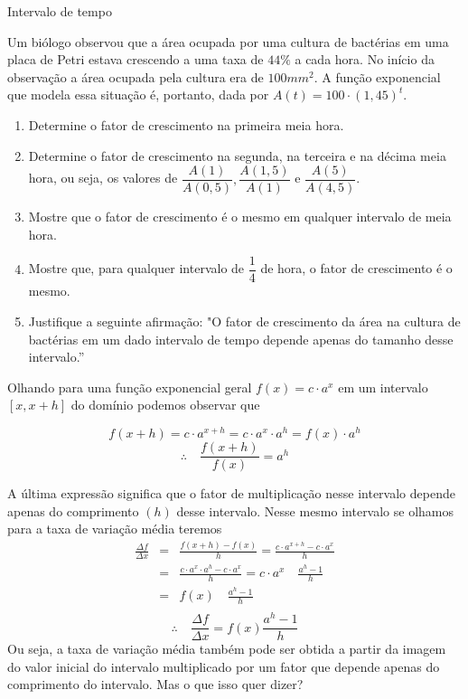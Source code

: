 \begin{task}{Intervalo de tempo}


Um biólogo observou que a área ocupada por uma cultura de bactérias em uma placa de Petri estava crescendo a uma taxa de $44\%$ a cada hora. No início da observação a área ocupada pela cultura era de $100 mm^{2}$. A função exponencial que modela essa situação é, portanto, dada por $A(t)=100\cdot(1,45)^{t}$.

\begin{enumerate}

\item{}
Determine o fator de crescimento na primeira meia hora.

\item{}
Determine o fator de crescimento na segunda, na terceira e na décima meia hora, ou seja, os valores de $\dfrac{A(1)}{A(0{,}5)}, \dfrac{A(1{,}5)}{A(1)}$ e $\dfrac{A(5)}{A(4{,}5)}$.

\item{}
Mostre que o fator de crescimento é o mesmo em qualquer intervalo de meia hora.

\item{}
Mostre que, para qualquer intervalo de $\dfrac{1}{4}$ de hora, o fator de crescimento é o mesmo.

\item{}
Justifique a seguinte afirmação: "O fator de crescimento da área na cultura de bactérias em um dado intervalo de tempo depende apenas do tamanho desse intervalo.''

\end{enumerate}

\end{task}


Olhando para uma função exponencial geral $f(x)=c\cdot a^x$ em um intervalo $[x,x+h]$ do domínio podemos observar que

\[
f(x+h)=c\cdot a^{x+h} = c \cdot a^x \cdot a^h = f(x) \cdot a^h
\]
\[
\therefore \quad \frac{f(x+h)}{f(x)}=a^h
\]

A última expressão significa que o fator de multiplicação nesse intervalo depende apenas do comprimento $(h)$ desse intervalo. Nesse mesmo intervalo se olhamos para a taxa de variação média teremos
\begin{eqnarray*}
\frac{\Delta f}{\Delta x}&=&\frac{f(x+h)-f(x)}{h}=\frac{c\cdot a^{x+h}-c\cdot a^x}{h}\\
&=& \frac{c\cdot a^x \cdot a^h-c\cdot a^x}{h} = c\cdot a^x \quad \frac{a^{h}-1}{h}\\
&=& f(x) \quad \frac{a^{h}-1}{h}\\
\end{eqnarray*}
\[
\therefore \quad \frac{\Delta f}{\Delta x}=f(x) \frac{a^{h}-1}{h}
\]
Ou seja, a taxa de variação média também pode ser obtida a partir da imagem do valor inicial do intervalo multiplicado por um fator que depende apenas do comprimento do intervalo. Mas o que isso quer dizer? 

